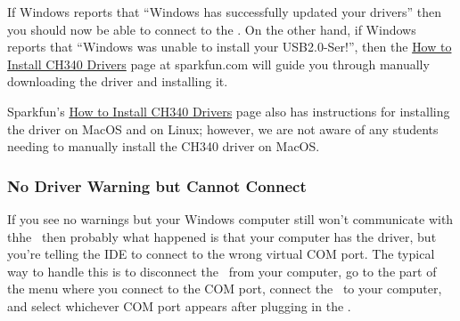 If Windows reports that ``Windows has successfully updated your drivers'' then you should now be able to connect to the \developmentboard.
On the other hand, if Windows reports that ``Windows was unable to install your USB2.0-Ser!'', then the \href{https://learn.sparkfun.com/tutorials/how-to-install-ch340-drivers/}{How to Install CH340 Drivers} page at sparkfun.com will guide you through manually downloading the driver and installing it.

Sparkfun's \href{https://learn.sparkfun.com/tutorials/how-to-install-ch340-drivers/}{How to Install CH340 Drivers} page also has instructions for installing the driver on MacOS and on Linux;
however, we are not aware of any students needing to manually install the CH340 driver on MacOS\@.

\subsubsection{No Driver Warning but Cannot Connect}

If you see no warnings but your Windows computer still won't communicate with thhe \developmentboard\, then probably what happened is that your computer has the driver, but you're telling the IDE to connect to the wrong virtual COM port.
The typical way to handle this is to disconnect the \developmentboard\ from your computer, go to the part of the menu where you connect to the COM port, connect the \developmentboard\ to your computer, and select whichever COM port appears after plugging in the \developmentboard.
